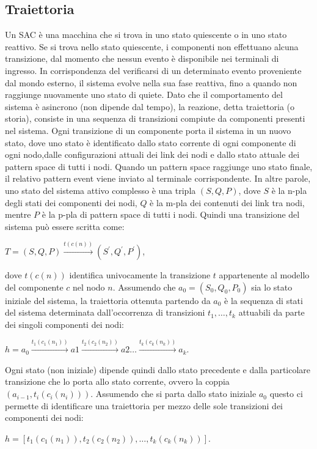 \subsection{Traiettoria}
Un SAC è una macchina che si trova in uno stato quiescente o in uno stato reattivo. Se si trova nello stato quiescente, i componenti non effettuano alcuna transizione, dal momento che nessun evento è disponibile nei terminali di ingresso. In corrispondenza del verificarsi di un determinato evento proveniente dal mondo esterno, il sistema evolve nella sua fase reattiva, fino a quando non raggiunge nuovamente uno stato di quiete. Dato che il comportamento del sistema è asincrono (non dipende dal tempo), la reazione, detta traiettoria (o storia), consiste in una sequenza di transizioni compiute da componenti presenti nel sistema.
Ogni transizione di un componente porta il sistema in un nuovo stato, dove uno stato è identificato dallo stato corrente di ogni componente di ogni nodo,dalle configurazioni attuali dei link dei nodi e dallo stato attuale dei pattern space di tutti i nodi. Quando un pattern space raggiunge uno stato finale, il relativo pattern event viene inviato al terminale corrispondente.
In altre parole, uno stato del sistema attivo complesso è una tripla $(S,Q,P)$, dove $S$ è la n-pla degli stati dei componenti dei nodi, $Q$ è la m-pla dei contenuti dei link tra nodi, mentre $P$ è la p-pla di pattern space di tutti i nodi.
Quindi una transizione del sistema può essere scritta come:
\begin{center}
	$T = (S,Q,P) \xrightarrow {t(c(n))} (S^\prime,Q^\prime,P^\prime)$,
\end{center}
dove $t(c(n))$ identifica univocamente la transizione $t$ appartenente al modello del componente $c$ nel nodo $n$.
Assumendo che $a_0 = (S_0,Q_0,P_0)$ sia lo stato iniziale del sistema, la traiettoria ottenuta partendo da $a_0$ è la sequenza di stati del sistema determinata dall'occorrenza di transizioni $t_1, \ldots , t_k$ attuabili da parte dei singoli componenti dei nodi:
\begin{center}
$h = a_0 \xrightarrow{t_1(c_1(n_1))} a1 \xrightarrow{t_2(c_2(n_2))} a2 \ldots \xrightarrow{t_k(c_k(n_k))} a_k$.
\end{center}

Ogni stato (non iniziale) dipende quindi dallo stato precedente e dalla particolare transizione che lo porta allo stato corrente, ovvero la coppia $(a_{i-1},t_i(c_i(n_i)))$. Assumendo che si parta dallo stato iniziale $a_0$ questo ci permette di identificare una traiettoria per mezzo delle sole transizioni dei componenti dei nodi:
\begin{center}
$h = [t_1(c_1(n_1)),t_2(c_2(n_2)), \ldots , t_k(c_k(n_k))]$.
\end{center}


